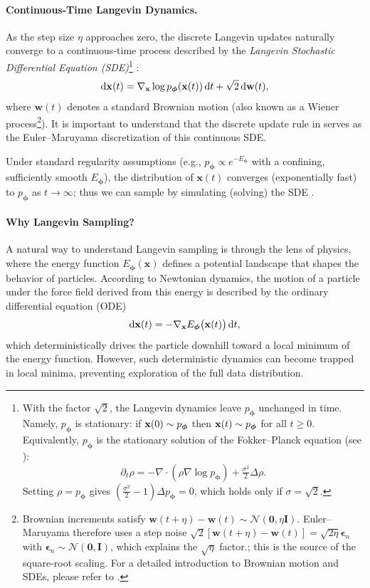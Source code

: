 \paragraph{Continuous-Time Langevin Dynamics.}
As the step size $\eta$ approaches zero, the discrete Langevin updates naturally converge to a continuous-time process described by the \emph{Langevin Stochastic Differential Equation (SDE)}\footnote{
With the factor $\sqrt{2}$, the Langevin dynamics leave $p_{\bm\phi}$ unchanged in time. Namely, $p_{\bm\phi}$ is stationary: if ${\mathbf{x}}(0)\sim p_{\bm\phi}$ then ${\mathbf{x}}(t)\sim p_{\bm\phi}$ for all $t\ge 0$. Equivalently, $p_{\bm\phi}$ is the stationary solution of the Fokker–Planck equation (see ):
\[
\partial_t \rho = -\nabla \cdot(\rho  \nabla\log p_{\bm\phi}) + \tfrac{\sigma^2}{2}\Delta \rho.
\]
Setting $\rho=p_{\bm\phi}$ gives $(\tfrac{\sigma^2}{2}-1)\Delta p_{\bm\phi}=0$, which holds only if $\sigma=\sqrt{2}$.
}
:
\begin{align}\label{eq:continuous-langevin}
 \mathop{}\!\mathrm{d} \mathbf{x}(t) = \nabla_{\mathbf{x}} \log p_{\bm{\phi}}(\mathbf{x}(t)) \mathop{}\!\mathrm{d} t + \sqrt{2} \mathop{}\!\mathrm{d} \mathbf{w}(t),
\end{align}
where $\mathbf{w}(t)$ denotes a standard Brownian motion (also known as a Wiener process\footnote{Brownian increments satisfy
$\mathbf{w}(t+\eta)-\mathbf{w}(t)\sim \mathcal{N}(\mathbf{0},  \eta  \mathbf{I})$.
Euler–Maruyama therefore uses a step noise $\sqrt{2}  [\mathbf{w}(t+\eta)-\mathbf{w}(t)]
= \sqrt{2\eta}  \bm{\epsilon}_n$ with $\bm{\epsilon}_n \sim \mathcal{N}(\mathbf{0},\mathbf{I})$,
which explains the $\sqrt{\eta}$ factor.; this is the source of the square-root scaling. For a detailed introduction to Brownian motion and SDEs, please refer to .}). It is important to understand that the discrete update rule in  serves as the Euler–Maruyama discretization of this continuous SDE.


Under standard regularity assumptions (e.g., $p_{\bm{\phi}}\propto e^{-E_{\bm{\phi}}}$ with a confining, sufficiently smooth $E_{\bm{\phi}}$), the distribution of $\mathbf{x}(t)$ converges (exponentially fast) to $p_{\bm{\phi}}$ as $t\to\infty$; thus we can sample by simulating (solving) the SDE . 



\paragraph{Why Langevin Sampling?}
A natural way to understand Langevin sampling is through the lens of physics, where the energy function $ E_{\bm{\phi}}(\mathbf{x}) $ defines a potential landscape that shapes the behavior of particles. According to Newtonian dynamics, the motion of a particle under the force field derived from this energy is described by the ordinary differential equation (ODE)
\[
\mathop{}\!\mathrm{d} \mathbf{x}(t) = -\nabla_{\mathbf{x}} E_{\bm{\phi}}\big(\mathbf{x}(t)\big)  \mathop{}\!\mathrm{d} t,
\]
which deterministically drives the particle downhill toward a local minimum of the energy function. However, such deterministic dynamics can become trapped in local minima, preventing exploration of the full data distribution.

